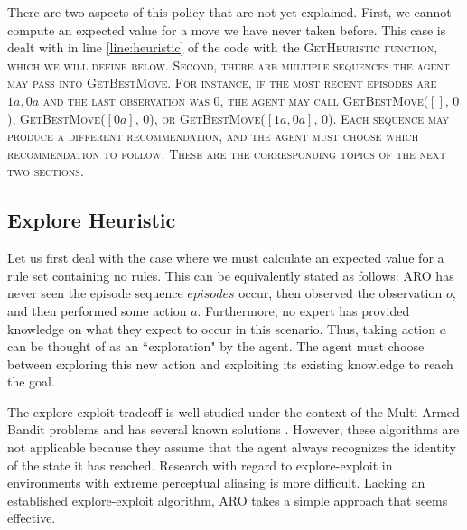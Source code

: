\documentclass[letterpaper]{article} %
\begin{document}
There are two aspects of this policy that are not yet
explained. First, we cannot compute an expected value for a move we
have never taken before. This case is dealt with in
line \ref{line:heuristic} of the code with the \scshape
GetHeuristic \normalfont function, which we will define below. Second,
there are multiple sequences the agent may pass into \scshape
GetBestMove\normalfont. For instance, if the most recent episodes are
$1a,0a$ and the last observation was $0$, the agent may call \scshape
GetBestMove\normalfont($[]$, $0$), \scshape
GetBestMove\normalfont($[0a]$, $0$), or \scshape
GetBestMove\normalfont($[1a, 0a]$, $0$). Each sequence may produce a
different recommendation, and the agent must choose which
recommendation to follow. These are the corresponding topics of the
next two sections.

\subsection{Explore Heuristic}

Let us first deal with the case where we must calculate an expected
value for a rule set containing no rules. This can be equivalently
stated as follows: ARO has never seen the episode sequence $episodes$
occur, then observed the observation $o$, and then performed some
action $a$. Furthermore, no expert has provided knowledge on what they
expect to occur in this scenario. Thus, taking action $a$ can be
thought of as an ``exploration" by the agent. The agent must choose
between exploring this new action and exploiting its existing
knowledge to reach the goal.

The explore-exploit tradeoff is well studied under the context of the
Multi-Armed Bandit problems \cite{Berry85} and has several known
solutions \cite{Sutton98,Kearns02,Brafman02}.  However, these
algorithms are not applicable because they assume that the agent
always recognizes the identity of the state it has reached.  Research
with regard to explore-exploit in environments with extreme perceptual
aliasing is more difficult.  Lacking an established explore-exploit
algorithm, ARO takes a simple approach that seems effective.
\end{document}
